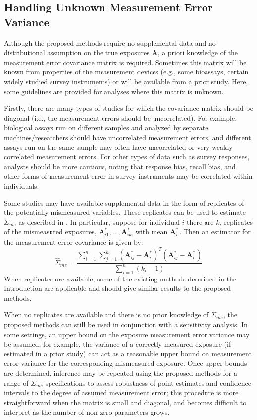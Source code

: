 \documentclass[useAMS,usenatbib,referee]{biom}
\begin{document}
\subsection{Handling Unknown Measurement Error Variance}

Although the proposed methods require no supplemental data and no distributional assumption on the true exposures $\bm{A}$, a priori knowledge of the measurement error covariance matrix is required. Sometimes this matrix will be known from properties of the measurement devices (e.g., some bioassays, certain widely studied survey instruments) or will be available from a prior study. Here, some guidelines are provided for analyses where this matrix is unknown.

Firstly, there are many types of studies for which the covariance matrix should be diagonal (i.e., the measurement errors should be uncorrelated). For example, biological assays run on different samples and analyzed by separate machines/researchers should have uncorrelated measurement errors, and different assays run on the same sample may often have uncorrelated or very weakly correlated measurement errors. For other types of data such as survey responses, analysts should be more cautious, noting that response bias, recall bias, and other forms of measurement error in survey instruments may be correlated within individuals.

Some studies may have available supplemental data in the form of replicates of the potentially mismeasured variables. These replicates can be used to estimate $\Sigma_{me}$ as described in \citet{carroll2006}. In particular, suppose for individual $i$ there are $k_{i}$ replicates of the mismeasured exposures, $\bm{A}^{*}_{i1}, ..., \bm{A}^{*}_{ik_{i}}$ with mean $\bm{A}^{*}_{i.}$. Then an estimator for the measurement error covariance is given by:
\begin{equation*}
    \hat{\Sigma}_{me} = \frac{\sum_{i=1}^{n} \sum_{j=1}^{k_{i}} (\bm{A}^{*}_{ij} - \bm{A}^{*}_{i.})^{T}(\bm{A}^{*}_{ij} - \bm{A}^{*}_{i.})}{\sum_{i=1}^{n}(k_{i} - 1)}
\end{equation*}
When replicates are available, some of the existing methods described in the Introduction are applicable and should give similar results to the proposed methods.

When no replicates are available and there is no prior knowledge of $\Sigma_{me}$, the proposed methods can still be used in conjunction with a sensitivity analysis. In some settings, an upper bound on the exposure measurement error variance may be assumed; for example, the variance of a correctly measured exposure (if estimated in a prior study) can act as a reasonable upper bound on measurement error variance for the corresponding mismeasured exposure. Once upper bounds are determined, inference may be repeated using the proposed methods for a range of $\Sigma_{me}$ specifications to assess robustness of point estimates and confidence intervals to the degree of assumed measurement error; this procedure is more straightforward when the matrix is small and diagonal, and becomes difficult to interpret as the number of non-zero parameters grows.
\end{document}
